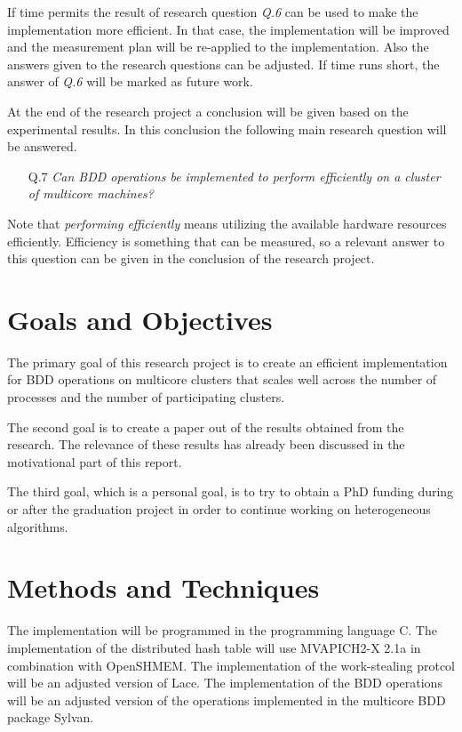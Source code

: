 If time permits the result of research question \textit{Q.6} can be used to make the implementation more efficient. In that case, the implementation will be improved and the measurement plan will be re-applied to the implementation. Also the answers given to the research questions can be adjusted. If time runs short, the answer of \textit{Q.6} will be marked as future work.

At the end of the research project a conclusion will be given based on the experimental results. In this conclusion the following main research question will be answered.

\begin{enumerate}
	\item[Q.7]{\textit{Can BDD operations be implemented to perform efficiently on a cluster of multicore machines?}}
\end{enumerate}

Note that \textit{performing efficiently} means utilizing the available hardware resources efficiently. Efficiency is something that can be measured, so a relevant answer to this question can be given in the conclusion of the research project.

\section{Goals and Objectives}
The primary goal of this research project is to create an efficient implementation for BDD operations on multicore clusters that scales well across the number of processes and the number of participating clusters. 

The second goal is to create a paper out of the results obtained from the research. The relevance of these results has already been discussed in the motivational part of this report.

The third goal, which is a personal goal, is to try to obtain a PhD funding during or after the graduation project in order to continue working on heterogeneous algorithms.

\section{Methods and Techniques}
The implementation will be programmed in the programming language C. The implementation of the distributed hash table will use MVAPICH2-X 2.1a in combination with OpenSHMEM. The implementation of the work-stealing protcol will be an adjusted version of Lace. The implementation of the BDD operations will be an adjusted version of the operations implemented in the multicore BDD package Sylvan.

